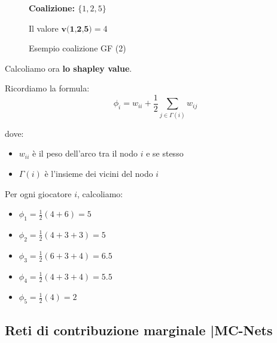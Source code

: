 \begin{figure}[H]
    \begin{center}
        \textbf{Coalizione: $\{1,2,5\}$}

        Il valore $\textbf{v(1,2,5)} = 4 $


    \end{center}
    \caption{Esempio coalizione GF (2)}
\end{figure}

Calcoliamo ora \textbf{lo shapley value}.

Ricordiamo la formula:
\[
    \phi_i = w_{ii} + \frac{1}{2} \sum_{j \in \Gamma(i)} w_{ij}
\]

dove:
\begin{itemize}
    \item $w_{ii}$ è il peso dell'arco tra il nodo $i$ e se stesso
    \item $\Gamma(i)$ è l'insieme dei vicini del nodo $i$
\end{itemize}

Per ogni giocatore $i$, calcoliamo:

\begin{itemize}
    \item $\phi_1 = \frac{1}{2} (4 + 6) = 5$
    \item $\phi_2 = \frac{1}{2} (4 + 3 + 3) = 5$
    \item $\phi_3 = \frac{1}{2} (6 + 3 + 4) = 6.5$
    \item $\phi_4 = \frac{1}{2} (4 + 3 + 4) = 5.5$
    \item $\phi_5 = \frac{1}{2} (4) = 2$
\end{itemize}

\subsection{Reti di contribuzione marginale |MC-Nets}

